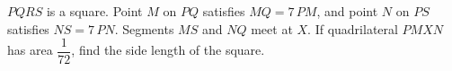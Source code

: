 $PQRS$ is a square. Point $M$ on $PQ$ satisfies $MQ=7\,PM$, and point $N$ on $PS$ satisfies $NS=7\,PN$. Segments $MS$ and $NQ$ meet at $X$. If quadrilateral $PMXN$ has area $\dfrac{1}{72}$, find the side length of the square.
